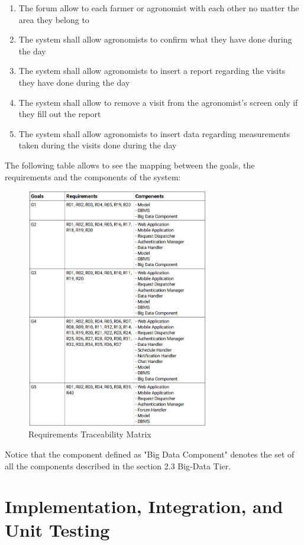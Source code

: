 \documentclass[10pt]{report}
\begin{document}
\begin{enumerate} [label=(R\arabic*), font=\itshape]
    \item The forum allow to each farmer or agronomist with each other no matter the area they belong to 
    \item The system shall allow agronomists to confirm what they have done during the day
    \item The system shall allow agronomists to insert a report regarding the visits they have done during the day
    \item The system shall allow to remove a visit from the agronomist’s screen only if they fill out the report
    \item The system shall allow agronomists to insert data regarding measurements taken during the visits done during the day
\end{enumerate}

The following table allows to see the mapping between the goals, the requirements and the components of the system:
\begin{figure}[H]
    \centering
    \includegraphics[width=300px]{Matrix/Matrix.jpg}
    \caption{Requirements Traceability Matrix}
\end{figure}

Notice that the component defined as "Big Data Component" denotes the set of all the components described in the section 2.3 Big-Data Tier.

\chapter{Implementation, Integration, and Unit Testing}
\end{document}
